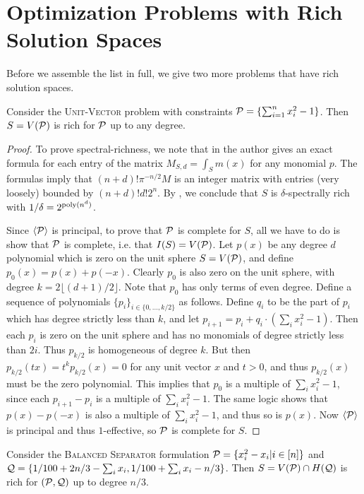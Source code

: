 \section{Optimization Problems with Rich Solution Spaces}
Before we assemble the list in full, we give two more problems that have rich solution spaces.
\begin{lemma}
Consider the \textsc{Unit-Vector} problem with constraints $\mathcal P = \{\sum_{i=1}^n x_i^2 - 1\}$. Then $S = V(\mathcal P)$ is rich for $\mathcal P$ up to any degree. 
\end{lemma}
\begin{proof}
To prove spectral-richness, we note that in \cite{10.2307/2695802} the author gives an exact formula for each entry of the matrix $M_{S,d} = \int_{S} m(x)$ for any monomial $p$. The formulas imply that $(n+d)!\pi^{-n/2} M$ is an integer matrix with entries (very loosely) bounded by $(n+d)!d!2^n$. By , we conclude that $S$ is $\delta$-spectrally rich with $1/\delta = 2^{\operatorname{poly}(n^d)}$.

Since $\langle \mathcal P \rangle$ is principal, to prove that $\mathcal P$ is complete for $S$, all we have to do is show that $\mathcal P$ is complete, i.e. that $I(S) = V(\mathcal P)$. Let $p(x)$ be any degree $d$ polynomial which is zero on the unit sphere $S = V(\mathcal P)$, and define $p_0(x) = p(x) + p(-x)$. Clearly $p_0$ is also zero on the unit sphere, with degree $k = 2\lfloor (d+1)/2 \rfloor$. Note that $p_0$ has only terms of even degree. 
%
Define a sequence of polynomials $\{p_i\}_{i \in \{0,\ldots, k/2\}}$ as follows.
Define $q_i$ to be the part of $p_i$ which has degree strictly less than $k$, and let $p_{i+1} = p_i + q_i\cdot(\sum_i x_i^2 - 1)$. Then each $p_i$ is zero on the unit sphere and has no monomials of degree strictly less than $2i$. Thus $p_{k/2}$ is homogeneous of degree $k$. But then $p_{k/2}(tx) = t^kp_{k/2}(x) = 0$ for any unit vector $x$ and $t > 0$, and thus $p_{k/2}(x)$ must be the zero polynomial. This implies that $p_0$ is a multiple of $\sum_i x_i^2 - 1$, since each $p_{i+1} - p_i$ is a multiple of $\sum_i x_i^2 -1$. The same logic shows that $p(x) - p(-x)$ is also a multiple of $\sum_i x_i^2 - 1$, and thus so is $p(x)$. Now $\langle \mathcal P\rangle$ is principal and thus $1$-effective, so $\mathcal P$ is complete for $S$. 
\end{proof}
\begin{lemma}
Consider the \textsc{Balanced Separator} formulation $\mathcal P = \{x_i^2 - x_i| i \in [n]\}$ and $\mathcal Q = \{1/100 + 2n/3 - \sum_i x_i, 1/100 + \sum_i x_i - n/3\}$. Then $S = V(\mathcal P) \cap H(\mathcal Q)$ is rich for $(\mathcal P, \mathcal Q)$ up to degree $n/3$.
\end{lemma}
